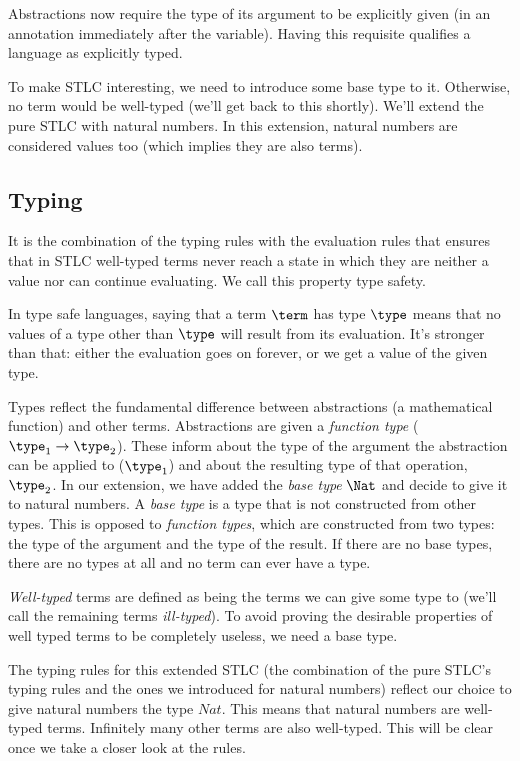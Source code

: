 Abstractions now require the type of its argument to be explicitly given (in an annotation immediately after the variable). Having this requisite qualifies a language as explicitly typed.

To make STLC interesting, we need to introduce some base type to it. Otherwise, no term would be well-typed (we'll get back to this shortly). We'll extend the pure STLC with natural numbers. In this extension, natural numbers are considered values too (which implies they are also terms).

\subsection{Typing}
It is the combination of the typing rules with the evaluation rules that ensures that in STLC well-typed terms never reach a state in which they are neither a value nor can continue evaluating. We call this property type safety.

In type safe languages, saying that a term $\term$ has type $\type$ means that no values of a type other than $\type$ will result from its evaluation. It's stronger than that: either the evaluation goes on forever, or we get a value of the given type.

Types reflect the fundamental difference between abstractions (a mathematical function) and other terms. Abstractions are given a \textit{function type} ($\type_1 \rightarrow \type_2$). These inform about the type of the argument the abstraction can be applied to ($\type_1$) and about the resulting type of that operation, $\type_2$. In our extension, we have added the \textit{base type} $\Nat$ and decide to give it to natural numbers. A \textit{base type} is a type that is not constructed from other types. This is opposed to \textit{function types}, which are constructed from two types: the type of the argument and the type of the result. If there are no base types, there are no types at all and no term can ever have a type.

\textit{Well-typed} terms are defined as being the terms we can give some type to (we'll call the remaining terms \textit{ill-typed}). To avoid proving the desirable properties of well typed terms to be completely useless, we need a base type.

The typing rules for this extended STLC (the combination of the pure STLC's typing rules and the ones we introduced for natural numbers) reflect our choice to give natural numbers the type $Nat$. This means that natural numbers are well-typed terms. Infinitely many other terms are also well-typed. This will be clear once we take a closer look at the rules.

